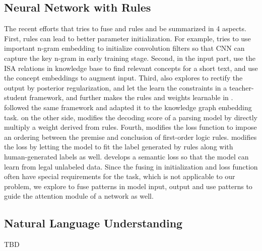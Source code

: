 \subsection{Neural Network with Rules}
The recent efforts that tries to fuse \NN and rules and be summarized in 4 aspects. First, rules can lead to better parameter initialization. For example, \cite{li2017initializing} tries to use important n-gram embedding to initialize convolution filters so that CNN can capture the key n-gram in early training stage. Second, in the input part, \cite{wangcombining17} use the ISA relations in knowledge base to find relevant concepts for a short text, and use the concept embeddings to augment input. Third, \cite{hu2016harnessing} also explores to rectify the \NN output by posterior regularization, and let the \NN learn the constraints in a teacher-student framework, and further makes the rules and weights learnable in \cite{hu2016deep}. \cite{guo2017knowledge} followed the same framework and adapted it to the knowledge graph embedding task. \cite{xiao2017symbolic} on the other side, modifies the decoding score of a parsing model by directly multiply a weight derived from rules. Fourth, \cite{demeester2016lifted} modifies the loss function to impose an ordering between the premise and conclusion of first-order logic rules. \cite{alashkar2017examples} modifies the loss by letting the model to fit the label generated by rules along with human-generated labels as well. \cite{xu2017semantic} develops a semantic loss so that the model can learn from legal unlabeled data. Since the fusing in initialization and loss function often have special requirements for the task, which is not applicable to our problem, we explore to fuse \RE patterns in model input, output and use \RE patterns to guide the attention module of a network as well.   

\subsection{Natural Language Understanding}
TBD



